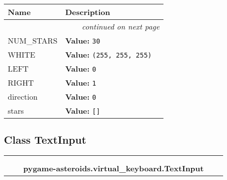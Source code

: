     \vspace{-1cm}
\hspace{\varindent}\begin{longtable}{|p{\varnamewidth}|p{\vardescrwidth}|l}
\cline{1-2}
\cline{1-2} \centering \textbf{Name} & \centering \textbf{Description}& \\
\cline{1-2}
\endhead\cline{1-2}\multicolumn{3}{r}{\small\textit{continued on next page}}\\\endfoot\cline{1-2}
\endlastfoot\raggedright N\-U\-M\-\_\-S\-T\-A\-R\-S\- & \raggedright \textbf{Value:} 
{\tt 30}&\\
\cline{1-2}
\raggedright W\-H\-I\-T\-E\- & \raggedright \textbf{Value:} 
{\tt \texttt{(}255\texttt{, }255\texttt{, }255\texttt{)}}&\\
\cline{1-2}
\raggedright L\-E\-F\-T\- & \raggedright \textbf{Value:} 
{\tt 0}&\\
\cline{1-2}
\raggedright R\-I\-G\-H\-T\- & \raggedright \textbf{Value:} 
{\tt 1}&\\
\cline{1-2}
\raggedright d\-i\-r\-e\-c\-t\-i\-o\-n\- & \raggedright \textbf{Value:} 
{\tt 0}&\\
\cline{1-2}
\raggedright s\-t\-a\-r\-s\- & \raggedright \textbf{Value:} 
{\tt \texttt{[}\texttt{]}}&\\
\cline{1-2}
\end{longtable}



\subsection{Class TextInput}

    \label{pygame-asteroids:virtual_keyboard:TextInput}
\begin{tabular}{cccccc}
\multicolumn{2}{r}{\settowidth{\BCL}{object}\multirow{2}{\BCL}{object}}
&&
  \\\cline{3-3}
  &&\multicolumn{1}{c|}{}
&&
  \\
&&\multicolumn{2}{l}{\textbf{pygame-asteroids.virtual\_keyboard.TextInput}}
\end{tabular}

